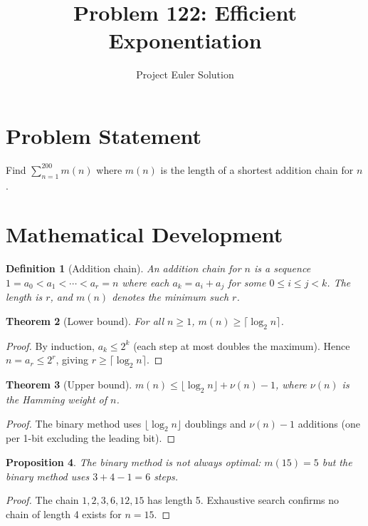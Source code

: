 \documentclass[11pt,a4paper]{article}
\title{Problem 122: Efficient Exponentiation}
\author{Project Euler Solution}
\date{}
\newtheorem{theorem}{Theorem}
\newtheorem{proposition}[theorem]{Proposition}
\newtheorem{definition}[theorem]{Definition}
\begin{document}
\maketitle

\section{Problem Statement}

Find $\sum_{n=1}^{200} m(n)$ where $m(n)$ is the length of a shortest addition chain for $n$.

\section{Mathematical Development}

\begin{definition}[Addition chain]
An addition chain for $n$ is a sequence $1 = a_0 < a_1 < \cdots < a_r = n$ where each $a_k = a_i + a_j$ for some $0 \le i \le j < k$. The length is $r$, and $m(n)$ denotes the minimum such $r$.
\end{definition}

\begin{theorem}[Lower bound]
For all $n \ge 1$, $m(n) \ge \lceil \log_2 n \rceil$.
\end{theorem}

\begin{proof}
By induction, $a_k \le 2^k$ (each step at most doubles the maximum). Hence $n = a_r \le 2^r$, giving $r \ge \lceil \log_2 n \rceil$.
\end{proof}

\begin{theorem}[Upper bound]
$m(n) \le \lfloor \log_2 n \rfloor + \nu(n) - 1$, where $\nu(n)$ is the Hamming weight of $n$.
\end{theorem}

\begin{proof}
The binary method uses $\lfloor \log_2 n \rfloor$ doublings and $\nu(n) - 1$ additions (one per 1-bit excluding the leading bit).
\end{proof}

\begin{proposition}
The binary method is not always optimal: $m(15) = 5$ but the binary method uses $3 + 4 - 1 = 6$ steps.
\end{proposition}

\begin{proof}
The chain $1, 2, 3, 6, 12, 15$ has length 5. Exhaustive search confirms no chain of length 4 exists for $n = 15$.
\end{proof}
\end{document}
